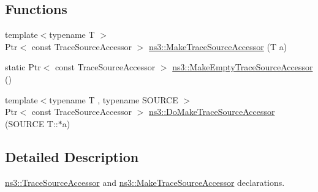 \subsection*{Functions}
\begin{DoxyCompactItemize}
\item 
{\footnotesize template$<$typename T $>$ }\\Ptr$<$ const Trace\+Source\+Accessor $>$ \hyperlink{group__tracing_gab21a770b9855af4e8f69f7531ea4a6b0}{ns3\+::\+Make\+Trace\+Source\+Accessor} (T a)
\item 
static Ptr$<$ const Trace\+Source\+Accessor $>$ \hyperlink{group__tracing_ga6706efc1edcf2de83784aaa7fb8a9609}{ns3\+::\+Make\+Empty\+Trace\+Source\+Accessor} ()
\item 
{\footnotesize template$<$typename T , typename S\+O\+U\+R\+CE $>$ }\\Ptr$<$ const Trace\+Source\+Accessor $>$ \hyperlink{group__tracing_ga58e9c4db480094cef0bb8d87118146e5}{ns3\+::\+Do\+Make\+Trace\+Source\+Accessor} (S\+O\+U\+R\+CE T\+::$\ast$a)
\end{DoxyCompactItemize}


\subsection{Detailed Description}
\hyperlink{classns3_1_1TraceSourceAccessor}{ns3\+::\+Trace\+Source\+Accessor} and \hyperlink{group__tracing_gab21a770b9855af4e8f69f7531ea4a6b0}{ns3\+::\+Make\+Trace\+Source\+Accessor} declarations. 